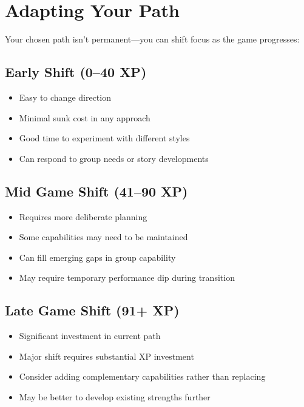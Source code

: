 \section{Adapting Your Path}

Your chosen path isn't permanent—you can shift focus as the game progresses:

\subsection*{Early Shift (0--40 XP)}
\begin{itemize}
\item Easy to change direction
\item Minimal sunk cost in any approach
\item Good time to experiment with different styles
\item Can respond to group needs or story developments
\end{itemize}

\subsection*{Mid Game Shift (41--90 XP)}
\begin{itemize}
\item Requires more deliberate planning
\item Some capabilities may need to be maintained
\item Can fill emerging gaps in group capability
\item May require temporary performance dip during transition
\end{itemize}

\subsection*{Late Game Shift (91+ XP)}
\begin{itemize}
\item Significant investment in current path
\item Major shift requires substantial XP investment
\item Consider adding complementary capabilities rather than replacing
\item May be better to develop existing strengths further
\end{itemize}

